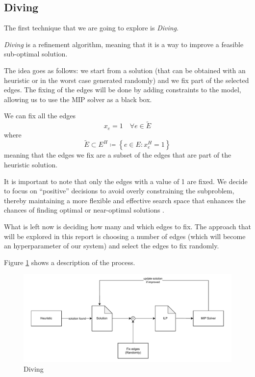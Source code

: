 \documentclass{article}
\begin{document}
\subsection{Diving}
The first technique that we are going to explore is \textit{Diving}.

\textit{Diving} is a refinement algorithm, meaning that it is a way to improve a feasible
sub-optimal solution.

The idea goes as follows: we start from a solution (that can be obtained with an heuristic or in
the worst case generated randomly) and we fix part of the selected edges. The fixing of the
edges will be done by adding constraints to the model, allowing us to use the MIP solver
as a black box.

We can fix all the edges
\begin{equation*}
  x_{e}=1 \quad \forall e \in \tilde{E}
\end{equation*}
where
\begin{equation*}
  \tilde{E} \subset E^{H} \coloneq \left\{ e \in E : x_{e}^{H} = 1 \right\}
\end{equation*}
meaning that the edges we fix are a subset of the edges that are part of the heuristic solution.

It is important to note that only the edges with a value of 1 are fixed. We
decide to focus on ``positive'' decisions to avoid overly constraining the
subproblem, thereby maintaining a more flexible and effective search space that
enhances the chances of finding optimal or near-optimal solutions \cite{maniezzo2021diving}.

What is left now is deciding how many and which edges to fix. The approach that will be explored
in this report is choosing a number of edges (which will become an hyperparameter of our system)
and select the edges to fix randomly.

Figure \ref{fig:diving} shows a description of the process.

\begin{figure}[H]
        \caption{Diving}
        \label{fig:diving}
        \centering
        \includegraphics[width=340pt]{assets/diving.drawio.pdf}
\end{figure}
\end{document}
